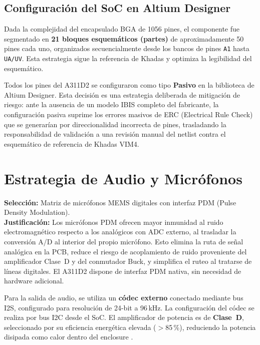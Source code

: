 \subsection{Configuración del SoC en Altium Designer}

Dada la complejidad del encapsulado BGA de 1056 pines, el componente fue segmentado en
\textbf{21 bloques esquemáticos (partes)} de aproximadamente 50 pines cada uno, organizados
secuencialmente desde los bancos de pines \texttt{A1} hasta \texttt{UA/UV}. Esta estrategia
sigue la referencia de Khadas y optimiza la legibilidad del esquemático.

\begin{infobox}
  Todos los pines del A311D2 se configuraron como tipo \textbf{Pasivo} en la biblioteca
  de Altium Designer. Esta decisión es una estrategia deliberada de mitigación de riesgo:
  ante la ausencia de un modelo IBIS completo del fabricante, la configuración pasiva
  suprime los errores masivos de ERC (Electrical Rule Check) que se generarían por
  direccionalidad incorrecta de pines, trasladando la responsabilidad de validación
  a una revisión manual del netlist contra el esquemático de referencia de Khadas VIM4.
\end{infobox}

\section{Estrategia de Audio y Micrófonos}
\label{sec:arq_audio}

\begin{decisbox}
  \textbf{Selección:} Matriz de micrófonos MEMS digitales con interfaz PDM
  (Pulse Density Modulation).\\[4pt]
  \textbf{Justificación:} Los micrófonos PDM ofrecen mayor inmunidad al ruido
  electromagnético respecto a los analógicos con ADC externo, al trasladar la
  conversión A/D al interior del propio micrófono. Esto elimina la ruta de señal
  analógica en la PCB, reduce el riesgo de acoplamiento de ruido proveniente del
  amplificador Clase~D y del conmutador Buck, y simplifica el ruteo al tratarse de
  líneas digitales. El A311D2 dispone de interfaz PDM nativa, sin necesidad de
  hardware adicional.
\end{decisbox}

Para la salida de audio, se utiliza un \textbf{códec externo} conectado mediante bus
I2S, configurado para resolución de 24-bit a 96\,kHz. La configuración del códec se
realiza por bus I2C desde el SoC. El amplificador de potencia es de \textbf{Clase~D},
seleccionado por su eficiencia energética elevada ($>$85\,\%), reduciendo la potencia
disipada como calor dentro del enclosure .



